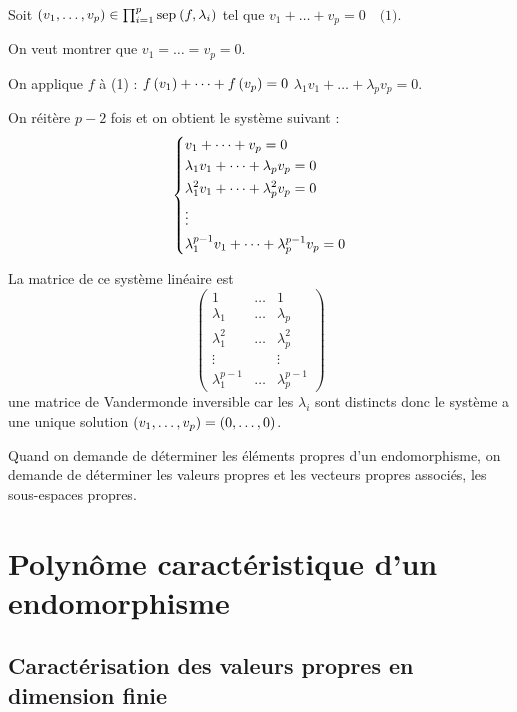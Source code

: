 \begin{dem}~\\
Soit \(\paren{v_1,\dots,v_p}\in\prod_{i=1}^p\sep{f}{\lambda_i}\) tel que \(v_1+\dots+v_p=0\quad\text{(1)}\).

On veut montrer que \(v_1=\dots=v_p=0\).

On applique \(f\) à (1) : \(f\left(v_1\right)+\dots+f\left(v_p\right)=0\) \ie \(\lambda_1v_1+\dots+\lambda_pv_p=0\).

On réitère \(p-2\) fois et on obtient le système suivant : \[\begin{dcases}
v_1+\dots+v_p=0 \\
\lambda_1v_1+\dots+\lambda_pv_p=0 \\
\lambda_1^2v_1+\dots+\lambda_p^2v_p=0 \\
\vdots \\
\lambda_1^{p-1}v_1+\dots+\lambda_p^{p-1}v_p=0
\end{dcases}\]

La matrice de ce système linéaire est \[\begin{pmatrix}
1 & \dots & 1 \\
\lambda_1 & \dots & \lambda_p \\
\lambda_1^2 & \dots & \lambda_p^2 \\
\vdots &  & \vdots \\
\lambda_1^{p-1} & \dots & \lambda_p^{p-1}
\end{pmatrix}\] \ie une matrice de Vandermonde inversible car les \(\lambda_i\) sont distincts donc le système a une unique solution \(\left(v_1,\dots,v_p\right)=\left(0,\dots,0\right)\).
\end{dem}

\begin{rem}
Quand on demande de déterminer les éléments propres d'un endomorphisme, on demande de déterminer les valeurs propres et les vecteurs propres associés, \ie les sous-espaces propres.
\end{rem}

\begin{center}
\bfseries
{}
\end{center}

\section{Polynôme caractéristique d'un endomorphisme}

\subsection{Caractérisation des valeurs propres en dimension finie}


